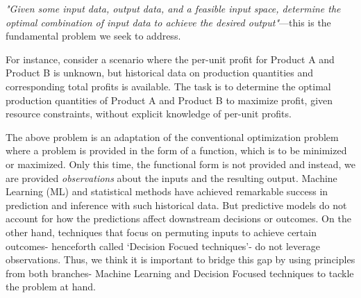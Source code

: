 \documentclass[12pt, letterpaper]{article}
\begin{document}

\textit{"Given some input data, output data, and a feasible input space, determine the optimal combination of input data to achieve the desired output"}—this is the fundamental problem we seek to address. 

For instance, consider a scenario where the per-unit profit for Product A and
Product B is unknown, but historical data on production quantities and
corresponding total profits is available. The task is to determine the optimal
production quantities of Product A and Product B to maximize profit, given
resource constraints, without explicit knowledge of per-unit profits.

The above problem is an adaptation of the conventional optimization problem
where a problem is provided in the form of a function, which is to be minimized
or maximized. Only this time, the functional form is not provided and instead,
we are provided \textit{observations} about the inputs and the resulting output.
Machine Learning (ML) and statistical methods have achieved remarkable success
in prediction and inference with such historical data. But predictive models do
not account for how the predictions affect downstream decisions or outcomes. On
the other hand, techniques that focus on permuting inputs to achieve certain
outcomes- henceforth called `Decision Focued techniques'- do not leverage
observations. Thus, we think it is important to bridge this gap by using
principles from both branches- Machine Learning and Decision Focused techniques
to tackle the problem at hand.
\end{document}

